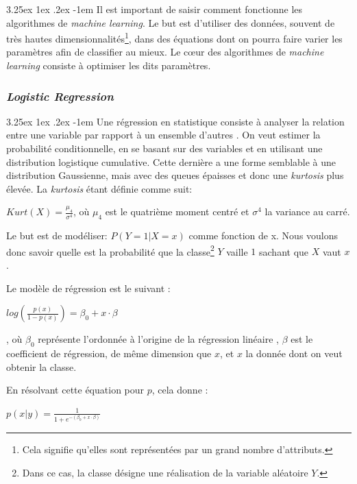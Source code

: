 \documentclass[a4paper, 11pt]{article}
\makeatletter
\renewcommand\paragraph{\@startsection{paragraph}{5}{\z@}%
  {3.25ex \@plus1ex \@minus.2ex}%
  {-1em}%
  {\normalfont\normalsize\bfseries}}
\makeatother
\begin{document}
\paragraph{}
Il est important de saisir comment fonctionne les algorithmes de \textit{machine learning}. 
Le but est d'utiliser des données, souvent de très hautes dimensionnalités\footnote{Cela signifie qu'elles 
sont représentées par un grand nombre d'attributs.}, dans des équations dont on pourra faire varier 
les paramètres afin de classifier au mieux. Le cœur des algorithmes de \textit{machine learning} 
consiste à optimiser les dits paramètres.

\subsubsection{\textit{Logistic Regression}} \label{section régression logistique}
\paragraph{}
Une régression en statistique consiste à analyser la relation entre une variable par rapport à un ensemble d'autres 
\cite{wikipedia_regression}. On veut estimer la probabilité conditionnelle, en se basant sur des variables et 
en utilisant une distribution logistique cumulative. Cette dernière a une forme semblable à une distribution Gaussienne, 
mais avec des queues épaisses et donc une \textit{kurtosis} plus élevée. La \textit{kurtosis} étant définie comme suit:
\begin{center}
$Kurt(X) = \frac{\mu_4}{\sigma^4}$, où $\mu_4$ est le quatrième moment centré et $\sigma^4$ la variance au carré. 
\end{center}
Le but est de modéliser: $P(Y=1 | X=x)$ comme fonction de x. Nous voulons donc savoir quelle est la probabilité que 
la classe\footnote{Dans ce cas, la classe désigne une réalisation de la variable aléatoire $Y$.} $Y$ vaille $1$ sachant que $X$ vaut $x$.

Le modèle de régression est le suivant \cite{machine_learning_automated_trading}:
\begin{center}
$log(\frac{p(x)}{1 - p(x)}) = \beta_0 + x \cdot \beta$
\end{center}
, où $\beta_0$ représente l'ordonnée à l'origine de la régression linéaire
, $\beta$ est le coefficient de régression, de même dimension que $x$, et $x$ la donnée dont on veut obtenir la classe.

En résolvant cette équation pour $p$, cela donne \cite{machine_learning_automated_trading}:
\begin{center}
$p(x|y) = \frac{1}{1 + e^{-(\beta_0 + x \cdot \beta)}}$
\end{center}
\end{document}
